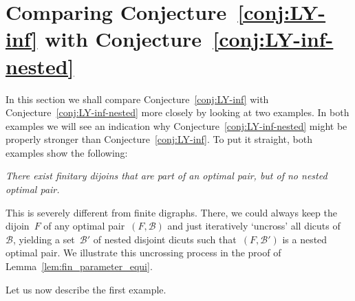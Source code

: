 \documentclass[reqno, 12pt]{amsart}
\numberwithin{equation}{section}
\numberwithin{figure}{section}
\theoremstyle{plain}
\theoremstyle{definition}
\begin{document}
\section{Comparing Conjecture~\ref{conj:LY-inf} with Conjecture~\ref{conj:LY-inf-nested}}
\label{sec:examples}

In this section we shall compare Conjecture~\ref{conj:LY-inf} with  Conjecture~\ref{conj:LY-inf-nested} more closely by looking at two examples. 
In both examples we will see an indication why Conjecture~\ref{conj:LY-inf-nested} might be properly stronger than Conjecture~\ref{conj:LY-inf}. 
To put it straight, both examples show the following: 

\vspace{5pt}

\begin{center}
    \emph{There exist finitary dijoins that are part of an optimal pair, but of no nested optimal pair.}
\end{center}

\vspace{5pt}

\noindent 
This is severely different from finite digraphs. 
There, we could always keep the dijoin~$F$ of any optimal pair~${(F, \mathcal{B})}$ and just iteratively `uncross' all dicuts of~$\mathcal{B}$,  yielding a set~$\mathcal{B}'$ of nested disjoint dicuts such that~${(F, \mathcal{B}')}$ is a nested optimal pair. 
We illustrate this uncrossing process in the proof of Lemma~\ref{lem:fin_parameter_equi}. 

Let us now describe the first example. 
\end{document}
